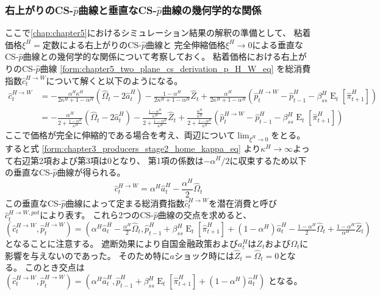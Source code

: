 \subsubsection{右上がりのCS-\(\hat{p}\)曲線と垂直なCS-\(\hat{p}\)曲線の幾何学的な関係}
\label{sec:chapter5_two_plane_cs_potential}
ここで\ref{chap:chapter5}におけるシミュレーション結果の解釈の準備として、
粘着価格\(\xi^H=定数\)による右上がりのCS-\(\hat{p}\)曲線と
完全伸縮価格\(\xi^H\to0\)による垂直なCS-\(\hat{p}\)曲線との幾何学的な関係について考察しておく。
粘着価格における右上がりのCS-\(\hat{p}\)曲線
\eqref{form:chapter5_two_plane_cs_derivation_p_H_W_eq}
を総消費指数\(\hat{c}_t^{H\to W}\)について解くと以下のようになる。
\begin{equation}
\label{form:chapter5_two_plane_cs_potential_c_H_W_eq}
    \begin{aligned}
        \hat{c}_t^{H\to W}&=-\frac{\alpha^H\kappa^H}{2\kappa^H+1-\alpha^H}(\hat{\Omega}_t-2\hat{a}_t^H)-\frac{1-\alpha^H}{2\kappa^H+1-\alpha^H}\hat{Z}_t+\frac{\alpha^H}{2\kappa^H+1-\alpha^H}(\hat{p}_t^{H\to W}-\hat{p}_{t-1}^H-\beta_{ss}^H\operatorname{E}_t[\hat{\pi}_{t+1}^H]) \\
        &=-\frac{\alpha^H}{2+\frac{1-\alpha^H}{\kappa^H}}(\hat{\Omega}_t-2\hat{a}_t^H)-\frac{\frac{1-\alpha^H}{\kappa^H}}{2+\frac{1-\alpha^H}{\kappa^H}}\hat{Z}_t+\frac{\frac{\alpha^H}{\kappa^H}}{2+\frac{1-\alpha^H}{\kappa^H}}(\hat{p}_t^{H\to W}-\hat{p}_{t-1}^H-\beta_{ss}^H\operatorname{E}_t[\hat{\pi}_{t+1}^H])
    \end{aligned}
\end{equation}
ここで価格が完全に伸縮的である場合を考え、両辺について\(\lim_{\xi^H\to0}\)をとる。
すると式
\eqref{form:chapter3_producers_stage2_home_kappa_eq}
より\(\kappa^H\to\infty\)よって右辺第2項および第3項は\(0\)となり、
第1項の係数は\(-\alpha^H/2\)に収束するため以下の垂直なCS-\(\hat{p}\)曲線が得られる。
\begin{equation}
\label{form:chapter5_two_plane_cs_potential_c_H_W_pot_eq}
    \hat{c}_t^{H\to W}=\alpha^H\hat{a}_t^H-\frac{\alpha^H}{2}\hat{\Omega}_t
\end{equation}
この垂直なCS-\(\hat{p}\)曲線によって定まる総消費指数\(\hat{c}_t^{H\to W}\)を潜在消費と呼び
\(\hat{c}_t^{H\to W,pot}\)により表す。
これら2つのCS-\(\hat{p}\)曲線の交点を求めると、
\((\hat{c}_t^{H\to W}, \hat{p}_t^{H\to W})=\left(\alpha^H\hat{a}_t^H-\frac{\alpha^H}{2}\hat{\Omega}_t, \hat{p}_{t-1}^H+\beta_{ss}^H\operatorname{E}_t[\hat{\pi}_{t+1}^H]+(1-\alpha^H)\hat{a}_t^H-\frac{1-\alpha^H}{2}\hat{\Omega}_t+\frac{1-\alpha^H}{\alpha^H}\hat{Z}_t\right)\)
となることに注意する。
遮断効果により自国金融政策および\(a_t^H\)は\(Z_t\)および\(\Omega_t\)に影響を与えないのであった。
そのため特に\(a\)ショック時には\(\hat{Z}_t=\hat{\Omega}_t=0\)となる。
このとき交点は
\((\hat{c}_t^{H\to W}, \hat{p}_t^{H\to W})=\left(\alpha^H\hat{a}_t^H, \hat{p}_{t-1}^H+\beta_{ss}^H\operatorname{E}_t[\hat{\pi}_{t+1}^H]+(1-\alpha^H)\hat{a}_t^H\right)\)
となる。
